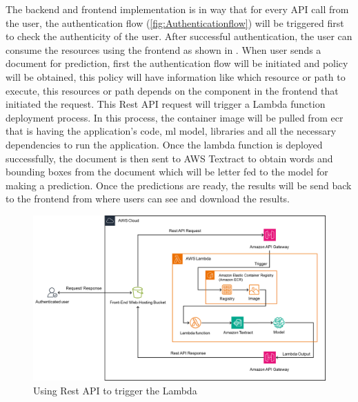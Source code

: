 The backend and frontend implementation is in way that for every API call from the user, the authentication flow (\ref{fig:Authenticationflow}) will be triggered first to check the authenticity of the user. After successful authentication, the user can consume the resources using the frontend as shown in . When user sends a document for prediction, first the authentication flow will be initiated and policy will be obtained, this policy will have information like which resource or path to execute, this resources or path depends on the component in the frontend that initiated the request. This Rest API request will trigger a Lambda function deployment process. In this process, the container image will be pulled from \acrshort{ecr} that is having the application's code, \acrshort{ml} model, libraries and all the necessary dependencies to run the application. Once the lambda function is deployed successfully, the document is then sent to AWS Textract to obtain words and bounding boxes from the document which will be letter fed to the model for making a prediction. Once the predictions are ready, the results will be send back to the frontend from where users can see and download the results. 


\begin{figure}[!ht]
    \centering
    \includegraphics[width=0.95 \textwidth]{chapters/images/Methods/Deployment/Restapi_trigger.png}
    \caption{Using Rest API to trigger the Lambda}
    \label{fig:API_workflow}
\end{figure}














